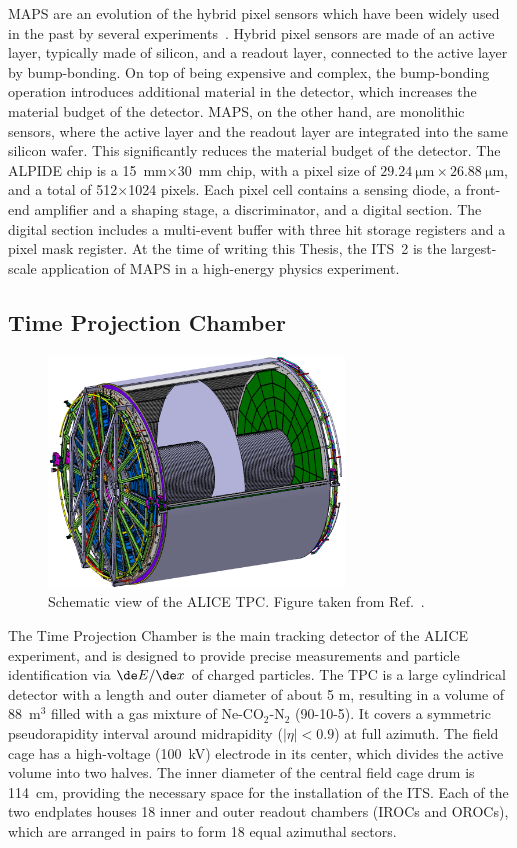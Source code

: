MAPS are an evolution of the hybrid pixel sensors which have been widely used in the past by several experiments~\cite{ALICE:2008ngc,CMS:1997tlf,Aad:2008zz,Bediaga:2013tje}. Hybrid pixel sensors are made of an active layer, typically made of silicon, and a readout layer, connected to the active layer by bump-bonding. On top of being expensive and complex, the bump-bonding operation introduces additional material in the detector, which increases the material budget of the detector. MAPS, on the other hand, are monolithic sensors, where the active layer and the readout layer are integrated into the same silicon wafer. This significantly reduces the material budget of the detector. The ALPIDE chip is a 15~mm$\times$30~mm chip, with a pixel size of $\SI{29.24}{\micro\meter}\times\SI{26.88}{\micro\meter}$, and a total of 512$\times$1024 pixels. Each pixel cell contains a sensing diode, a front-end amplifier and a shaping stage, a discriminator, and a digital section. The digital section includes a multi-event buffer with three hit storage registers and a pixel mask register. At the time of writing this Thesis, the ITS~2 is the largest-scale application of MAPS in a high-energy physics experiment.

\subsection{Time Projection Chamber}
\begin{figure}
    \centering
    \includegraphics[width=0.7\textwidth]{Figures/Chapter 3/TPC_Scheme.png}
    \caption{Schematic view of the ALICE TPC. Figure taken from Ref.~\cite{ALICE:2023udb}.}
    \label{fig:TPC}
\end{figure}
The Time Projection Chamber is the main tracking detector of the ALICE experiment, and is designed to provide precise \pt measurements and particle identification via $\de E/\de x$ of charged particles. The TPC is a large cylindrical detector with a length and outer diameter of about 5 m, resulting in a volume of 88~m$^3$ filled with a gas mixture of Ne-CO$_2$-N$_2$ (90-10-5). It covers a symmetric pseudorapidity interval around midrapidity ($\lvert\eta\rvert < 0.9$) at full azimuth. The field cage has a high-voltage (100~kV) electrode in its center, which divides the active volume into two halves. The inner diameter of the central field cage drum is 114~cm, providing the necessary space for the installation of the ITS.  Each of the two endplates houses 18 inner and outer readout chambers (IROCs and OROCs), which are arranged in pairs to form 18 equal azimuthal sectors.

